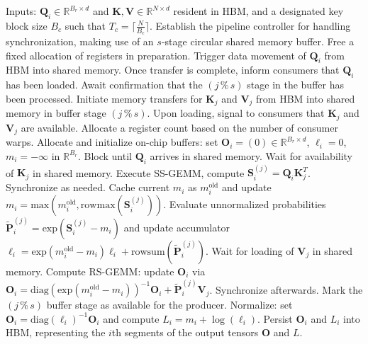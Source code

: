 \begin{algorithm}[H]
    \caption{\small\label{alg:flash3_wgmma_ws_only}\textsc{FlashAttention-3} forward pass \textbf{excluding} intra-consumer overlap -- CTA perspective}
    \begin{algorithmic}[1]
\REQUIRE Inputs: $\mathbf{Q}_i \in \mathbb{R}^{B_r \times d}$ and $\mathbf{K}, \mathbf{V} \in \mathbb{R}^{N \times d}$ resident in HBM, and a designated key block size $B_c$ such that $T_c = \lceil \frac{N}{B_c} \rceil$.
\STATE Establish the pipeline controller for handling synchronization, making use of an $s$-stage circular shared memory buffer.
\STATE Free a fixed allocation of registers in preparation.
\STATE Trigger data movement of $\mathbf{Q}_i$ from HBM into shared memory.
\STATE Once transfer is complete, inform consumers that $\mathbf{Q}_i$ has been loaded.
    \STATE Await confirmation that the $(j\,\%\,s)$ stage in the buffer has been processed.
    \STATE Initiate memory transfers for $\mathbf{K}_j$ and $\mathbf{V}_j$ from HBM into shared memory in buffer stage $(j\,\%\,s)$.
    \STATE Upon loading, signal to consumers that $\mathbf{K}_j$ and $\mathbf{V}_j$ are available.
\ENDFOR
\ELSE \STATE Allocate a register count based on the number of consumer warps.
\STATE Allocate and initialize on-chip buffers: set $\mathbf{O}_i = (0) \in \mathbb{R}^{B_r \times d}$, $\ell_i = 0$, $m_i = -\infty$ in $\mathbb{R}^{B_r}$.
\STATE Block until $\mathbf{Q}_i$ arrives in shared memory.
\STATE Wait for availability of $\mathbf{K}_j$ in shared memory.
\STATE Execute SS-GEMM, compute $\mathbf{S}_i^{(j)} = \mathbf{Q}_i \mathbf{K}_j^T$. Synchronize as needed. \label{alg:ws_only_gemm1}
\STATE Cache current $m_i$ as $m_i^{\mathrm{old}}$ and update $m_i = \mathrm{max}(m_i^{\mathrm{old}}, \mathrm{rowmax}(\mathbf{S}_i^{(j)}))$. \label{code-ws:softmax_start}
\STATE Evaluate unnormalized probabilities $\widetilde{\mathbf{P}}_i^{(j)} = \mathrm{exp}(\mathbf{S}_i^{(j)} - m_i)$ and update accumulator $\ell_i = \mathrm{exp}(m_i^{\mathrm{old}} - m_i)\ell_i + \mathrm{rowsum}(\widetilde{\mathbf{P}}_i^{(j)})$. \label{code-ws:softmax_end}
\STATE Wait for loading of $\mathbf{V}_j$ in shared memory.
\STATE Compute RS-GEMM: update $\mathbf{O}_i$ via $\mathbf{O}_i = \mathrm{diag}(\mathrm{exp}(m_i^{\mathrm{old}} - m_i))^{-1}\mathbf{O}_i + \widetilde{\mathbf{P}}_i^{(j)}\mathbf{V}_j$. Synchronize afterwards. \label{alg:ws_only_gemm2}
\STATE Mark the $(j\,\%\,s)$ buffer stage as available for the producer.
\ENDFOR
\STATE Normalize: set $\mathbf{O}_i = \mathrm{diag}(\ell_i)^{-1}\mathbf{O}_i$ and compute $L_i = m_i + \log(\ell_i)$.
\STATE Persist $\mathbf{O}_i$ and $L_i$ into HBM, representing the $i$th segments of the output tensors $\mathbf{O}$ and $L$.
\ENDIF
\end{algorithmic}
\end{algorithm}

